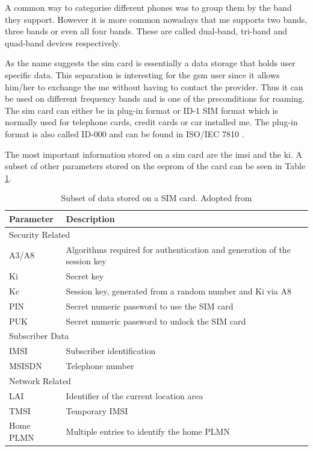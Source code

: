 A common way to categorise different phones was to group them by the band they support.
However it is more common nowadays that \gls{me} supports two bands, three bands or even all four bands.
These are called dual-band, tri-band and quad-band devices respectively.

As the name suggests the \gls{sim} card is essentially a data storage that holds user specific data.
This separation is interesting for the \gls{gsm} user since it allows him/her to exchange the \gls{me} without having to contact the provider.
Thus it can be used on different frequency bands and is one of the preconditions for roaming.
The \gls{sim} card can either be in plug-in format or ID-1 SIM format which is normally used for telephone cards, credit cards or car installed \gls{me}.
The plug-in format is also called ID-000 and can be found in ISO/IEC 7810 \cite{ISO7810}.

The most important information stored on a \gls{sim} card are the \gls{imsi} and the \gls{ki}.
A subset of other parameters stored on the \gls{eeprom} of the card can be seen in Table \ref{tab:simdata}.

\begin{table}
\centering
\begin{tabular}{@{}l>{\raggedright\arraybackslash}p{}@{}}
\toprule
Parameter		&Description\\
\midrule
\multicolumn{2}{l}{Security Related}\\
\midrule
A3/A8			&Algorithms required for authentication and generation of the session key\\
Ki				&Secret key\\
Kc				&Session key, generated from a random number and Ki via A8\\
PIN				&Secret numeric password to use the SIM card\\
PUK				&Secret numeric password to unlock the SIM card\\
\midrule
\multicolumn{2}{l}{Subscriber Data}\\
\midrule
IMSI			&Subscriber identification\\
MSISDN			&Telephone number\\
\midrule
\multicolumn{2}{l}{Network Related}\\
\midrule
LAI				&Identifier of the current location area\\
TMSI			&Temporary IMSI\\
Home PLMN		&Multiple entries to identify the home PLMN\\
\bottomrule
\end{tabular}
\caption{Subset of data stored on a SIM card. Adopted from \cite{protocols1999}}
\label{tab:simdata}
\end{table}

